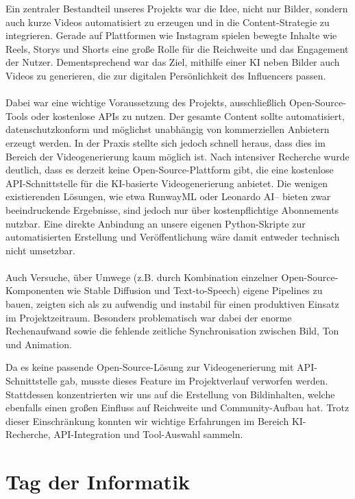 \documentclass[a4paper,12pt]{article}
\begin{document}
Ein zentraler Bestandteil unseres Projekts war die Idee, nicht nur Bilder, sondern auch kurze Videos automatisiert zu erzeugen und in die Content-Strategie zu integrieren. Gerade auf Plattformen wie Instagram spielen bewegte Inhalte wie Reels, Storys und Shorts eine große Rolle für die Reichweite und das Engagement der Nutzer. Dementsprechend war das Ziel, mithilfe einer KI neben Bilder auch Videos zu generieren, die zur digitalen Persönlichkeit des Influencers passen. \\\\
Dabei war eine wichtige Voraussetzung des Projekts, ausschließlich Open-Source-Tools oder kostenlose APIs zu nutzen. Der gesamte Content sollte automatisiert, datenschutzkonform und möglichst unabhängig von kommerziellen Anbietern erzeugt werden. In der Praxis stellte sich jedoch schnell heraus, dass dies im Bereich der Videogenerierung kaum möglich ist.
Nach intensiver Recherche wurde deutlich, dass es derzeit keine Open-Source-Plattform gibt, die eine kostenlose API-Schnittstelle für die KI-basierte Videogenerierung anbietet. Die wenigen existierenden Lösungen, wie etwa RunwayML oder Leonardo AI– bieten zwar beeindruckende Ergebnisse, sind jedoch nur über kostenpflichtige Abonnements nutzbar. Eine direkte Anbindung an unsere eigenen Python-Skripte zur automatisierten Erstellung und Veröffentlichung wäre damit entweder technisch nicht umsetzbar. \\\\
Auch Versuche, über Umwege (z.B. durch Kombination einzelner Open-Source-Komponenten wie Stable Diffusion und Text-to-Speech) eigene Pipelines zu bauen, zeigten sich als zu aufwendig und instabil für einen produktiven Einsatz im Projektzeitraum. Besonders problematisch war dabei der enorme Rechenaufwand sowie die fehlende zeitliche Synchronisation zwischen Bild, Ton und Animation.

Da es keine passende Open-Source-Lösung zur Videogenerierung mit API-Schnittstelle gab, musste dieses Feature im Projektverlauf verworfen werden. Stattdessen konzentrierten wir uns auf die Erstellung von Bildinhalten, welche ebenfalls einen großen Einfluss auf Reichweite und Community-Aufbau hat. Trotz dieser Einschränkung konnten wir wichtige Erfahrungen im Bereich KI-Recherche, API-Integration und Tool-Auswahl sammeln.


\section{Tag der Informatik}
\end{document}
